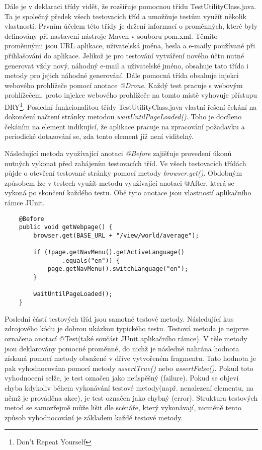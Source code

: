 \documentclass[
    color,   %
	table,   %
    twoside, %
    nolot, nolof
]{fithesis3}
\begin{document}
Dále je v deklaraci třídy vidět, že rozšiřuje pomocnou třídu TestUtilityClass.java. Ta je společný předek všech testovacích tříd a umožňuje testům využít několik vlastností. Prvním účelem této třídy je držení informací o proměnných, které byly definovány při nastavení nástroje Maven v souboru pom.xml. Těmito proměnnými jsou URL aplikace, uživatelská jména, hesla a e-maily používané při přihlašování do aplikace. Jelikož je pro testování vytváření nového účtu nutné generovat vždy nový, náhodný e-mail a uživatelské jméno, obsahuje tato třída i metody pro jejich náhodné generování. Dále pomocná třída obsahuje injekci webového prohlížeče pomocí anotace \emph{@Drone}. Každý test pracuje s webovým prohlížečem, proto injekce webového prohlížeče na tomto místě vyhovuje přístupu DRY\footnote{Don't Repeat Yourself}. Poslední funkcionalitou třídy TestUtilityClass.java vlastní řešení čekání na dokončení načtení stránky metodou \emph{waitUntilPageLoaded()}. Toho je docíleno čekáním na element indikující, že aplikace pracuje na zpracování požadavku a periodické dotazování se, zda tento element již není viditelný.

Následující metoda využívající anotaci \emph{@Before} zajišťuje provedení úkonů nutných vykonat před zahájením testovacích tříd. Ve všech testovacích třídách půjde o otevření testované stránky pomocí metody \emph{browser.get()}. Obdobným způsobem lze v testech využít metodu využívající anotaci @After, která se vykoná po skončení každého testu. Obě tyto anotace jsou vlastností aplikačního rámce JUnit.

\begin{lstlisting}
	@Before
	public void getWebpage() {
		browser.get(BASE_URL + "/view/world/average");
		
		if (!page.getNavMenu().getActiveLanguage()
				.equals("en")) {
			page.getNavMenu().switchLanguage("en");
		}
		
		waitUntilPageLoaded();
	}
\end{lstlisting} 

Poslední částí testových tříd jsou samotné testové metody. Následující kus zdrojového kódu je dobrou ukázkou typického testu. Testová metoda je nejprve označena anotací @Test(také součást JUnit aplikačního rámce). V těle metody jsou deklarovány pomocné proměnné, do nichž je následně nahrána hodnota získaná pomocí metody obsažené v dříve vytvořeném fragmentu. Tato hodnota je pak vyhodnocována pomocí metody \emph{assertTrue()} nebo  \emph{assertFalse()}. Pokud toto vyhodnocení selže, je test označen jako neúspěšný (failure). Pokud se objeví chyba kdykoliv během vykonávání testové metody(např. nenalezení elementu, na němž je prováděna akce), je test označen jako chybný (error). Struktura testových metod se samozřejmě může lišit dle scénáře, který vykonávají, nicméně tento způsob vyhodnocování je základem každé testové metody.
\end{document}
